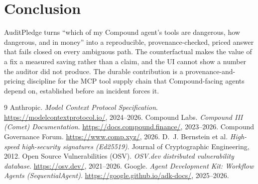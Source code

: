 \documentclass[11pt]{article}
\begin{document}
\section{Conclusion}
AuditPledge turns ``which of my Compound agent's tools are dangerous, how dangerous, and in
money'' into a reproducible, provenance-checked, priced answer that fails closed on every
ambiguous path. The counterfactual makes the value of a fix a measured saving rather than a
claim, and the UI cannot show a number the auditor did not produce. The durable contribution is
a provenance-and-pricing discipline for the MCP tool supply chain that Compound-facing agents
depend on, established before an incident forces it.

\begin{thebibliography}{9}
 Anthropic. \emph{Model Context Protocol Specification}. \url{https://modelcontextprotocol.io/}, 2024--2026.
 Compound Labs. \emph{Compound III (Comet) Documentation}. \url{https://docs.compound.finance/}, 2023--2026.
 Compound Governance Forum. \url{https://www.comp.xyz/}, 2026.
 D.~J. Bernstein et al. \emph{High-speed high-security signatures (Ed25519)}. Journal of Cryptographic Engineering, 2012.
 Open Source Vulnerabilities (OSV). \emph{OSV.dev distributed vulnerability database}. \url{https://osv.dev/}, 2021--2026.
 Google. \emph{Agent Development Kit: Workflow Agents (SequentialAgent)}. \url{https://google.github.io/adk-docs/}, 2025--2026.
\end{thebibliography}
\end{document}
